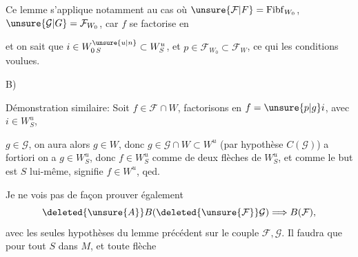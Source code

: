 
Ce lemme s'applique notamment au cas où $\unsure{\mathcal{F}|F}=\mathrm{Fibf}_{W_0}$, $\unsure{\mathcal{G}|G}=\mathcal{F}_{W_0}$, car $f$ se factorise en


et on sait que $i\in W_{0\,S}^{\unsure{u|n}}\subset W_S^u$, et $p\in\mathcal{F}_{W_0}\subset\mathcal{F}_{W}$, ce qui  les conditions voulues.

B) 

Démonstration similaire: Soit $f\in\mathcal{F}\cap W$, factorisons en $f=\unsure{p|g}i$, avec $i\in W_S^u$,


$g\in\mathcal{G}$, on aura alors $g\in W$, donc $g\in\mathcal{G}\cap W\subset W^u$ (par hypothèse  $C(\mathcal{G})$) a fortiori on a $g\in W_S^u$, donc $f\in W_S^u$ comme  de deux flèches de $W_S^u$, et comme le but  est $S$ lui-même,  signifie $f\in W^u$, qed.

Je ne vois pas de façon  prouver également
\[
 \deleted{\unsure{A}}B(\deleted{\unsure{\mathcal{F}}}\mathcal{G})\Longrightarrow B(\mathcal{F}),
\]
avec les seules hypothèses du lemme précédent sur le couple $\mathcal{F},\mathcal{G}$. Il faudra que pour tout $S$ dans $M$, et toute flèche
